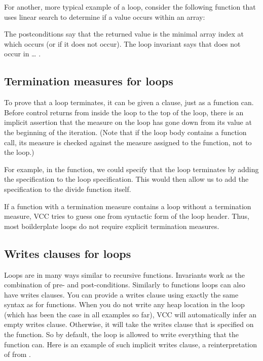 For another, more typical example of a loop, consider 
the following function that uses linear search to determine if a value
occurs within an array:


\noindent
The postconditions say that the returned value is the minimal array
index at which  occurs (or  if it does not occur).
The loop invariant says that   does not occur in \dots
{}.

\subsection{Termination measures for loops}
\label{sect:loopTermination}
To prove that a loop terminates, it can be given a 
clause, just as a function can. Before control returns from inside the
loop to the top of the loop, there is an implicit assertion that the
measure on the loop has gone down from its value at the beginning of
the iteration. (Note that if the loop body contains a function call,
its measure is checked against the measure assigned to the function,
not to the loop.)

For example, in the  function, we could specify that the
loop terminates by adding the specification  to
the loop specification. This would then allow us to add the
specification  to the divide function itself.

If a function with a termination measure contains a  loop
without a termination measure, VCC tries to guess one from syntactic
form of the loop header. Thus, most boilderplate  loops do
not require explicit termination measures.

\subsection{Writes clauses for loops}
\label{sect:sorting}

Loops are in many ways similar to recursive functions.
Invariants work as the combination of pre- and post-conditions.
Similarly to functions loops can also have writes clauses.
You can provide a writes clause using exactly the same syntax
as for functions.
When you do not write any heap location in the loop (which has been
the case in all examples so far), VCC will automatically infer
an empty writes clause.
Otherwise, it will take the writes clause that is specified on
the function.
So by default, the loop is allowed to write everything that the function
can.
Here is an example of such implicit writes clause,
a reinterpretation of  from .

